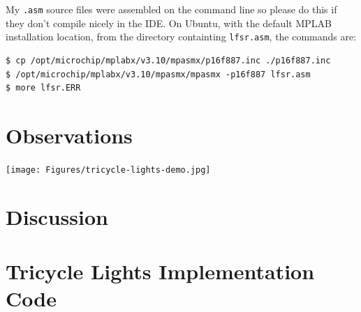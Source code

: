 \documentclass[11pt]{article}
\begin{document}
My \texttt{.asm} source files were assembled on the command line so
please do this if they don't compile nicely in the IDE.
On Ubuntu, with the default MPLAB installation location, 
from the directory containting \texttt{lfsr.asm}, the commands are:
\begin{verbatim}
$ cp /opt/microchip/mplabx/v3.10/mpasmx/p16f887.inc ./p16f887.inc
$ /opt/microchip/mplabx/v3.10/mpasmx/mpasmx -p16f887 lfsr.asm
$ more lfsr.ERR
\end{verbatim}

\section{Observations}

\begin{center}
	\texttt{[image: Figures/tricycle-lights-demo.jpg]}
	\label{tricycle-lights-jpg}
\end{center}

\section{Discussion}

\clearpage

\section{Tricycle Lights Implementation Code}
\label{implementation-code}


\end{document}
